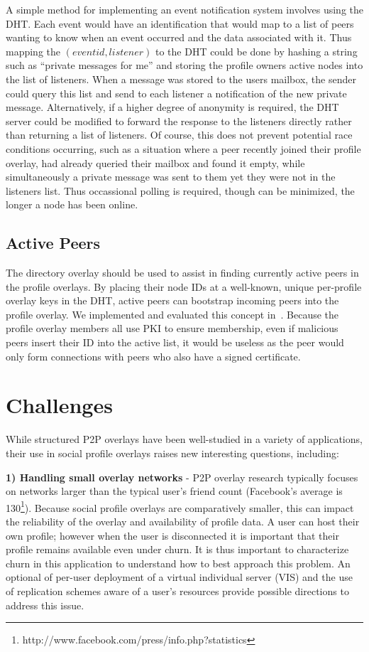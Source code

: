 \documentclass[conference]{IEEEtran}
\begin{document}
A simple method for implementing an event notification system involves using
the DHT.  Each event would have an identification that would map to a list of
peers wanting to know when an event occurred and the data associated with it.
Thus mapping the $(event id, listener)$ to the DHT could be done by hashing
a string such as ``private messages for me'' and storing the profile owners
active nodes into the list of listeners.  When a message was stored to the
users mailbox, the sender could query this list and send to each listener a
notification of the new private message.  Alternatively, if a higher degree of
anonymity is required, the DHT server could be modified to forward the
response to the listeners directly rather than returning a list of listeners.
Of course, this does not prevent potential race conditions occurring, such as
a situation where a peer recently joined their profile overlay, had already
queried their mailbox and found it empty, while simultaneously a private message
was sent to them yet they were not in the listeners list.  Thus occassional
polling is required, though can be minimized, the longer a node has been online.

\subsection{Active Peers}
The directory overlay should be used to assist in finding currently active peers
in the profile overlays.  By placing their node IDs at a well-known, unique
per-profile overlay keys in the DHT, active peers can bootstrap incoming peers
into the profile overlay.  We implemented and evaluated this concept
in~\cite{icdcs10}.  Because the profile overlay members all use PKI to ensure
membership, even if malicious peers insert their ID into the active list, it
would be useless as the peer would only form connections with peers who also
have a signed certificate.

\section{Challenges}
\label{outstanding}
While structured P2P overlays have been well-studied in a variety of applications,
their use in social profile overlays raises new interesting questions, including:

{\bf 1) Handling small overlay networks} - P2P overlay research typically focuses on
networks larger than the typical user's friend count (Facebook's average is
130\footnote{http://www.facebook.com/press/info.php?statistics}).  Because social profile overlays are comparatively smaller, this can
impact the reliability of the overlay and availability of profile data.  A user
can host their own profile; however when the user is disconnected it is important
that their profile remains available even under churn. It is thus important to
characterize churn in this application to understand how to best approach this
problem. An optional of per-user deployment of a virtual individual server (VIS)
and the use of replication schemes aware of a user's resources provide possible
directions to address this issue.
\end{document}
